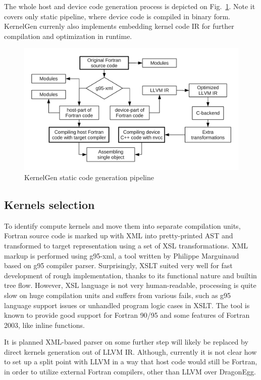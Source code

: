 \documentclass[a4,12pt]{article}
\begin{document}
The whole host and device code generation process is depicted on Fig.~\ref{fig:pipeline}. Note it covers only static pipeline, where device code is compiled in binary form. KernelGen currenly also implements embedding kernel code IR for further compilation and optimization in runtime.

\begin{figure}
\centering
\includegraphics[scale=0.5]{figures/pipeline.pdf}
\caption{KernelGen static code generation pipeline}
\label{fig:pipeline}
\end{figure}

\subsection{Kernels selection}

To identify compute kernels and move them into separate compilation units, Fortran source code is marked up with XML into pretty-printed AST and transformed to target representation using a set of XSL transformations. XML markup is performed using g95-xml, a tool written by Philippe Marguinaud based on g95 compiler parser. Surprisingly, XSLT suited very well for fast development of rough implementation, thanks to its functional nature and builtin tree flow. However, XSL language is not very human-readable, processing is quite slow on huge compilation units and suffers from various fails, such as g95 language support issues or unhandled program logic cases in XSLT. The tool is known to provide good support for Fortran 90/95 and some features of Fortran 2003, like inline functions.

It is planned XML-based parser on some further step will likely be replaced by direct kernels generation out of LLVM IR. Although, currently it is not clear how to set up a split point with LLVM in a way that host code would still be Fortran, in order to utilize external Fortran compilers, other than LLVM over DragonEgg.
\end{document}
